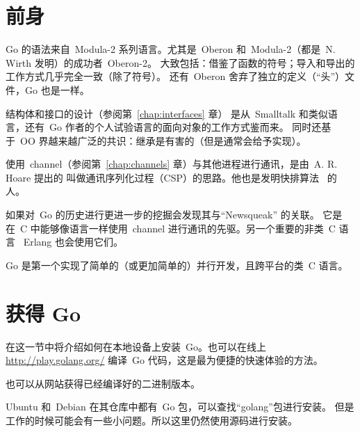 \section{前身}
Go 的语法来自~Modula-2 系列语言。尤其是~Oberon 和~Modula-2（都是~N. Wirth 发明）的成功者~Oberon-2。
大致包括：借鉴了函数的符号；导入和导出的工作方式几乎完全一致（除了符号）。 
还有~Oberon 舍弃了独立的定义（“头”）文件，Go 也是一样。

结构体和接口的设计（参阅第~\ref{chap:interfaces} 章）
是从~Smalltalk 和类似语言，还有~Go 作者的个人试验语言的面向对象的工作方式鉴而来。
同时还基于~OO 界越来越广泛的共识：继承是有害的（但是通常会给予实现）。

使用~channel（参阅第~\ref{chap:channels} 章）与其他进程进行通讯，是由~A. R. Hoare \cite{hoare}提出的
叫做通讯序列化过程（CSP）的思路。他也是发明快排算法~\cite{quicksort} 的人。

如果对~Go 的历史进行更进一步的挖掘会发现其与``Newsqueak'' \cite{newsqueak} 的关联。
它是在~C 中能够像语言一样使用~channel 进行通讯的先驱。另一个重要的非类~C 语言
~Erlang \cite{erlang} 也会使用它们。

\begin{lbar}[]
Go 是第一个实现了简单的（或更加简单的）并行开发，且跨平台的类~C 语言。
\end{lbar}

\section{获得 Go}
在这一节中将介绍如何在本地设备上安装~Go。也可以在线上 \url{http://play.golang.org/} 编译~Go 代码，这是最为便捷的快速体验的方法。

也可以从网站\cite{go_install}获得已经编译好的二进制版本。

Ubuntu 和~Debian 在其仓库中都有~Go 包，可以查找``golang''包进行安装。
但是工作的时候可能会有一些小问题。所以这里仍然使用源码进行安装。


